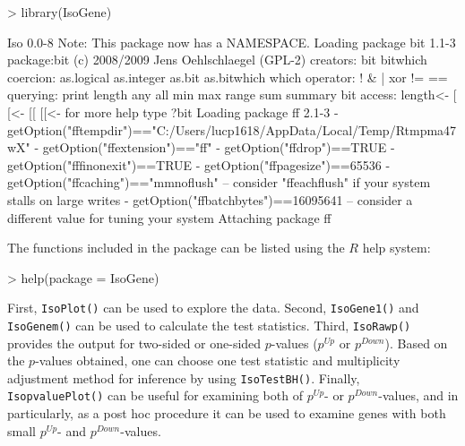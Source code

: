 \documentclass[10pt]{article}
\begin{document}
\begin{Schunk}
\begin{Sinput}
> library(IsoGene)
\end{Sinput}
\begin{Soutput}
Iso 0.0-8 
Note: This package now has a NAMESPACE.
Loading package bit 1.1-3 
package:bit (c) 2008/2009 Jens Oehlschlaegel (GPL-2)
creators: bit bitwhich
coercion: as.logical as.integer as.bit as.bitwhich which
operator: ! & | xor != == 
querying: print length any all min max range sum summary
bit access: length<- [ [<- [[ [[<-
for more help type ?bit
Loading package ff 2.1-3 
- getOption("fftempdir")=="C:/Users/lucp1618/AppData/Local/Temp/Rtmpma47wX"
- getOption("ffextension")=="ff"
- getOption("ffdrop")==TRUE
- getOption("fffinonexit")==TRUE
- getOption("ffpagesize")==65536
- getOption("ffcaching")=="mmnoflush"  -- consider "ffeachflush" if your system stalls on large writes
- getOption("ffbatchbytes")==16095641 -- consider a different value for tuning your system
Attaching package ff
\end{Soutput}
\end{Schunk}

The functions included in the package can be listed using the $R$
help system:

\begin{Schunk}
\begin{Sinput}
> help(package = IsoGene)
\end{Sinput}
\end{Schunk}






First, \texttt{IsoPlot()} can be used to
explore the data. Second, \texttt{IsoGene1()} and
\texttt{IsoGenem()} can be used to calculate the test statistics.
Third, \texttt{IsoRawp()} provides the output for two-sided or
one-sided $p$-values ($p^{Up}$ or $p^{Down}$). Based on the
$p$-values obtained, one can choose one test statistic and
multiplicity adjustment method for inference by using
\texttt{IsoTestBH()}. Finally, \texttt{IsopvaluePlot()} can be
useful for examining both of $p^{Up}$- or $p^{Down}$-values, and in
particularly, as a post hoc procedure it can be used to examine
genes with both small $p^{Up}$- and $p^{Down}$-values.
\end{document}
